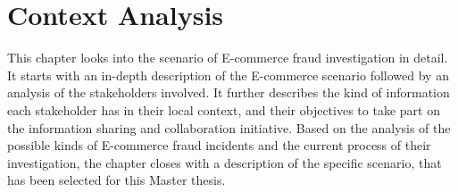 
\chapter{Context Analysis} %
\label{cha:context_analysis}

This chapter looks into the scenario of \gls{E-commerce} fraud investigation in detail. It starts with an in-depth description of the \gls{E-commerce} scenario followed by an analysis of the stakeholders involved. It further describes the kind of information each stakeholder has in their local context, and their objectives to take part on the information sharing and collaboration initiative. Based on the analysis of the possible kinds of \gls{E-commerce} fraud incidents and the current process of their investigation, the chapter closes with a description of the specific scenario, that has been selected for this Master thesis.











